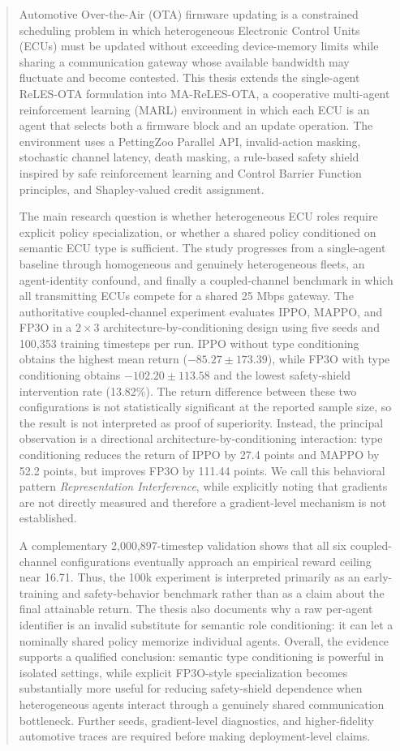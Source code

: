 \documentclass{iutbscthesis}
\begin{document}
\begin{abstract}
Automotive Over-the-Air (OTA) firmware updating is a constrained scheduling problem in which heterogeneous Electronic Control Units (ECUs) must be updated without exceeding device-memory limits while sharing a communication gateway whose available bandwidth may fluctuate and become contested. This thesis extends the single-agent ReLES-OTA formulation into MA-ReLES-OTA, a cooperative multi-agent reinforcement learning (MARL) environment in which each ECU is an agent that selects both a firmware block and an update operation. The environment uses a PettingZoo Parallel API, invalid-action masking, stochastic channel latency, death masking, a rule-based safety shield inspired by safe reinforcement learning and Control Barrier Function principles, and Shapley-valued credit assignment.

The main research question is whether heterogeneous ECU roles require explicit policy specialization, or whether a shared policy conditioned on semantic ECU type is sufficient. The study progresses from a single-agent baseline through homogeneous and genuinely heterogeneous fleets, an agent-identity confound, and finally a coupled-channel benchmark in which all transmitting ECUs compete for a shared 25 Mbps gateway. The authoritative coupled-channel experiment evaluates IPPO, MAPPO, and FP3O in a $2\times3$ architecture-by-conditioning design using five seeds and 100,353 training timesteps per run. IPPO without type conditioning obtains the highest mean return ($-85.27\pm173.39$), while FP3O with type conditioning obtains $-102.20\pm113.58$ and the lowest safety-shield intervention rate (13.82\%). The return difference between these two configurations is not statistically significant at the reported sample size, so the result is not interpreted as proof of superiority. Instead, the principal observation is a directional architecture-by-conditioning interaction: type conditioning reduces the return of IPPO by 27.4 points and MAPPO by 52.2 points, but improves FP3O by 111.44 points. We call this behavioral pattern \emph{Representation Interference}, while explicitly noting that gradients are not directly measured and therefore a gradient-level mechanism is not established.

A complementary 2,000,897-timestep validation shows that all six coupled-channel configurations eventually approach an empirical reward ceiling near 16.71. Thus, the 100k experiment is interpreted primarily as an early-training and safety-behavior benchmark rather than as a claim about the final attainable return. The thesis also documents why a raw per-agent identifier is an invalid substitute for semantic role conditioning: it can let a nominally shared policy memorize individual agents. Overall, the evidence supports a qualified conclusion: semantic type conditioning is powerful in isolated settings, while explicit FP3O-style specialization becomes substantially more useful for reducing safety-shield dependence when heterogeneous agents interact through a genuinely shared communication bottleneck. Further seeds, gradient-level diagnostics, and higher-fidelity automotive traces are required before making deployment-level claims.
\end{abstract}
\end{document}
